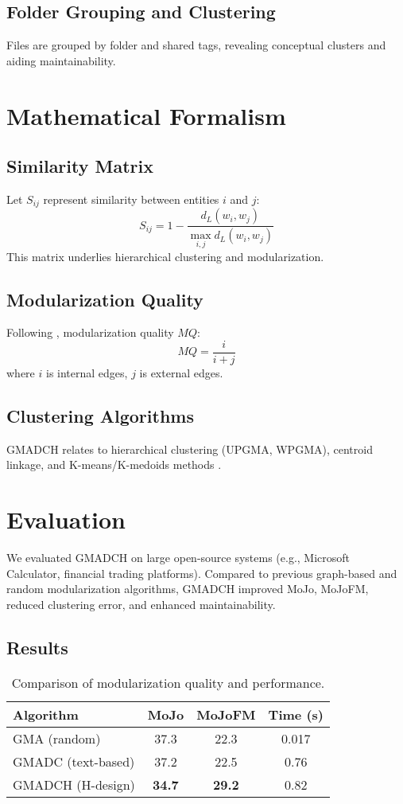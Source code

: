 \documentclass[a4paper,12pt]{article}
\begin{document}
\subsection{Folder Grouping and Clustering}
Files are grouped by folder and shared tags, revealing conceptual clusters and aiding maintainability.

\section{Mathematical Formalism}
\subsection{Similarity Matrix}
Let $S_{ij}$ represent similarity between entities $i$ and $j$:
\begin{equation}
S_{ij} = 1 - \frac{d_L(w_i, w_j)}{\max_{i,j} d_L(w_i, w_j)}
\end{equation}
This matrix underlies hierarchical clustering and modularization.

\subsection{Modularization Quality}
Following \cite{Izadkhah2016}, modularization quality $MQ$:
\begin{equation}
MQ = \frac{i}{i + j}
\end{equation}
where $i$ is internal edges, $j$ is external edges.

\subsection{Clustering Algorithms}
GMADCH relates to hierarchical clustering (UPGMA, WPGMA), centroid linkage, and K-means/K-medoids methods \cite{SokalMichener1958,Macqueen1967,Steinhaus1957,Forgy1965}.

\section{Evaluation}
We evaluated GMADCH on large open-source systems (e.g., Microsoft Calculator, financial trading platforms). Compared to previous graph-based and random modularization algorithms, GMADCH improved MoJo, MoJoFM, reduced clustering error, and enhanced maintainability.

\subsection{Results}
\begin{table}[h!]
\centering
\begin{tabular}{lccc}
\hline
Algorithm & MoJo & MoJoFM & Time (s) \\
\hline
GMA (random) & 37.3 & 22.3 & 0.017 \\
GMADC (text-based) & 37.2 & 22.5 & 0.76 \\
GMADCH (H-design) & \textbf{34.7} & \textbf{29.2} & 0.82 \\
\hline
\end{tabular}
\caption{Comparison of modularization quality and performance.}
\end{table}
\end{document}
